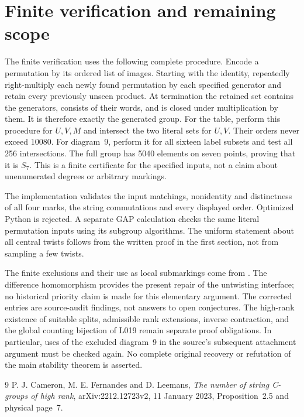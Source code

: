 \documentclass[a4paper,11pt]{article}
\begin{document}
\section{Finite verification and remaining scope}
The finite verification uses the following complete procedure. Encode a
permutation by its ordered list of images. Starting with the identity,
repeatedly right-multiply each newly found permutation by each specified
generator and retain every previously unseen product. At termination the
retained set contains the generators, consists of their words, and is
closed under multiplication by them. It is therefore exactly the generated
group. For the table, perform this procedure for $U,V,M$ and intersect
the two literal sets for $U,V$. Their orders never exceed 10080. For
diagram~9, perform it for all sixteen label subsets and test all 256
intersections. The full group has 5040 elements on seven points, proving
that it is $S_7$. This is a finite certificate for the specified inputs,
not a claim about unenumerated degrees or arbitrary markings.

The implementation validates the input matchings, nonidentity and
distinctness of all four marks, the string commutations and every displayed
order. Optimized Python is rejected. A separate GAP calculation checks the
same literal permutation inputs using its subgroup algorithms. The
uniform statement about all central twists follows from the written proof
in the first section, not from sampling a few twists.

The finite exclusions and their use as local submarkings come from
\cite[Proposition~2.5]{source}. The difference homomorphism provides the
present repair of the untwisting interface; no historical priority claim is
made for this elementary argument. The corrected entries are source-audit
findings, not answers to open conjectures. The high-rank existence of
suitable splits, admissible rank extensions, inverse contraction, and the
global counting bijection of L019 remain separate proof obligations.
In particular, uses of the excluded diagram~9 in the source's subsequent
attachment argument must be checked again. No complete original recovery
or refutation of the main stability theorem is asserted.

\begin{thebibliography}{9}
 P. J. Cameron, M. E. Fernandes and D. Leemans,
\emph{The number of string C-groups of high rank},
arXiv:2212.12723v2, 11 January 2023, Proposition~2.5 and physical page~7.
\end{thebibliography}
\end{document}
